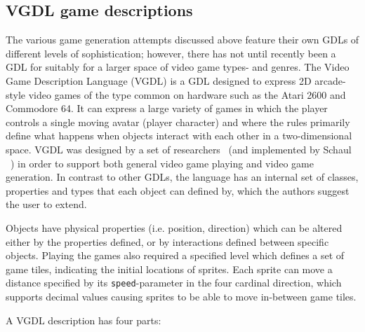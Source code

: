 \documentclass[a4paper,titlepage,final]{report}
\begin{document}
\subsection{VGDL game descriptions}
\label{ssec_vgdl}
The various game generation attempts discussed above feature their own GDLs of different levels of sophistication; however, there has not until recently been a GDL for suitably for a larger space of video game types- and genres.
The Video Game Description Language (VGDL) is a GDL designed to express 2D arcade-style video games of the type common on hardware such as the Atari 2600 and Commodore 64. 
It can express a large variety of games in which the player controls a single moving avatar (player character) and where the rules primarily define what happens when objects interact with each other in a two-dimensional space. 
VGDL was designed by a set of researchers~\citet{levine2013general,ebner2013towards} (and implemented by Schaul ~\citet{schaul2013video}) in order to support both general video game playing and video game generation.
In contrast to other GDLs, the language has an internal set of classes, properties and types that each object can defined by, which the authors suggest the user to extend.

Objects have physical properties (i.e. position, direction) which can be altered either by the properties defined, or by interactions defined between specific objects. 
Playing the games also required a specified level which defines a set of game tiles, indicating the initial locations of sprites. 
Each sprite can move a distance specified by its \texttt{speed}-parameter in the four cardinal direction, which supports decimal values causing sprites to be able to move in-between game tiles.

A VGDL description has four parts: 
\end{document}
